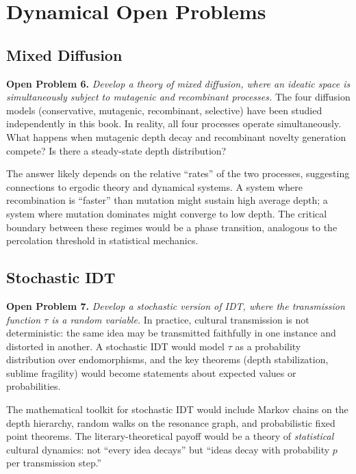 \documentclass[11pt,openany]{book}
\theoremstyle{definition}
\theoremstyle{plain}
\theoremstyle{remark}
\newcommand{\transmit}{\tau}                 %
\begin{document}
\section{Dynamical Open Problems}

\subsection{Mixed Diffusion}

\textbf{Open Problem 6.} \emph{Develop a theory of mixed diffusion, where an ideatic space is simultaneously subject to mutagenic and recombinant processes.} The four diffusion models (conservative, mutagenic, recombinant, selective) have been studied independently in this book. In reality, all four processes operate simultaneously. What happens when mutagenic depth decay and recombinant novelty generation compete? Is there a steady-state depth distribution?

The answer likely depends on the relative ``rates'' of the two processes, suggesting connections to ergodic theory and dynamical systems. A system where recombination is ``faster'' than mutation might sustain high average depth; a system where mutation dominates might converge to low depth. The critical boundary between these regimes would be a phase transition, analogous to the percolation threshold in statistical mechanics.

\subsection{Stochastic IDT}

\textbf{Open Problem 7.} \emph{Develop a stochastic version of IDT, where the transmission function $\transmit$ is a random variable.} In practice, cultural transmission is not deterministic: the same idea may be transmitted faithfully in one instance and distorted in another. A stochastic IDT would model $\transmit$ as a probability distribution over endomorphisms, and the key theorems (depth stabilization, sublime fragility) would become statements about expected values or probabilities.

The mathematical toolkit for stochastic IDT would include Markov chains on the depth hierarchy, random walks on the resonance graph, and probabilistic fixed point theorems. The literary-theoretical payoff would be a theory of \emph{statistical} cultural dynamics: not ``every idea decays'' but ``ideas decay with probability $p$ per transmission step.''
\end{document}
